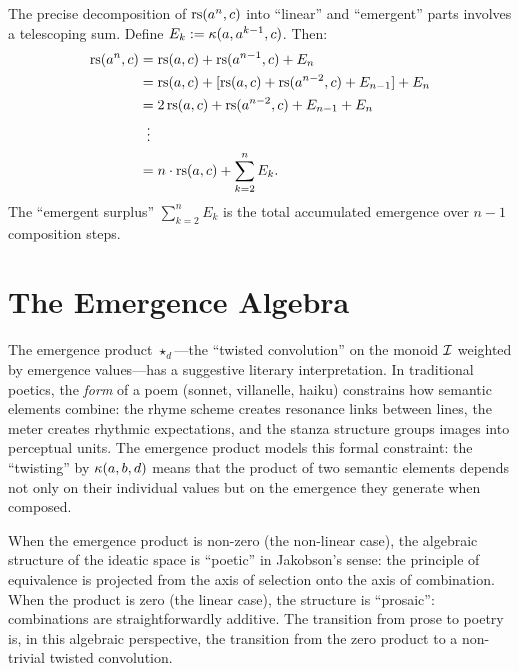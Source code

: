 \begin{remark}
The precise decomposition of $\mathrm{rs}(a^n, c)$ into ``linear'' and ``emergent''
parts involves a telescoping sum. Define $E_k := \kappa(a, a^{k-1}, c)$.
Then:
\begin{align*}
    \mathrm{rs}(a^n, c) &= \mathrm{rs}(a, c) + \mathrm{rs}(a^{n-1}, c) + E_n \\
    &= \mathrm{rs}(a, c) + [\mathrm{rs}(a, c) + \mathrm{rs}(a^{n-2}, c) + E_{n-1}] + E_n \\
    &= 2\,\mathrm{rs}(a, c) + \mathrm{rs}(a^{n-2}, c) + E_{n-1} + E_n \\
    &\;\;\vdots \\
    &= n \cdot \mathrm{rs}(a, c) + \sum_{k=2}^{n} E_k.
\end{align*}
The ``emergent surplus'' $\sum_{k=2}^n E_k$ is the total accumulated
emergence over $n-1$ composition steps.
\end{remark}

\section{The Emergence Algebra}

\begin{remark}\label{rem:ch5:emergence_poetic_form}
The emergence product $\star_d$---the ``twisted convolution'' on the
monoid $\mathcal{I}$ weighted by emergence values---has a suggestive literary
interpretation. In traditional poetics, the \emph{form} of a poem
(sonnet, villanelle, haiku) constrains how semantic elements combine:
the rhyme scheme creates resonance links between lines, the meter creates
rhythmic expectations, and the stanza structure groups images into
perceptual units. The emergence product models this formal constraint:
the ``twisting'' by $\kappa(a, b, d)$ means that the product of two
semantic elements depends not only on their individual values but on
the emergence they generate when composed.

When the emergence product is non-zero (the non-linear case), the
algebraic structure of the ideatic space is ``poetic'' in Jakobson's
sense: the principle of equivalence is projected from the axis of
selection onto the axis of combination. When the product is zero (the
linear case), the structure is ``prosaic'': combinations are
straightforwardly additive. The transition from prose to poetry is,
in this algebraic perspective, the transition from the zero product
to a non-trivial twisted convolution.
\end{remark}

